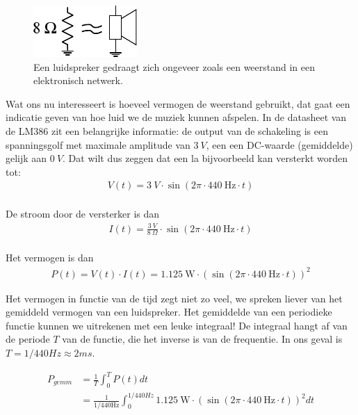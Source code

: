 \documentclass{article}
\begin{document}
			\begin{figure}[htbp]
				\centering
				\includegraphics[scale=1.5]{luidspreker}
				\caption{Een luidspreker gedraagt zich ongeveer zoals een weerstand in een elektronisch netwerk.}
				\label{fig:luidspreker}
			\end{figure}

			Wat ons nu interesseert is hoeveel vermogen de weerstand gebruikt, dat gaat een indicatie geven van hoe luid we de muziek kunnen afspelen.
			In de datasheet van de LM386 zit  een belangrijke informatie: de output van de schakeling is een spanningsgolf met maximale amplitude van $3~V$, een een DC-waarde (gemiddelde) gelijk aan $0~V$.
			Dat wilt dus zeggen dat een la bijvoorbeeld kan versterkt worden tot:
			\begin{align}
				V(t) = 3~V \cdot \sin (2\pi \cdot 440~\text{Hz} \cdot t) \\
			\end{align}

			De stroom door de versterker is dan 
				\begin{align}
				I(t) = \frac{3~V}{8~\Omega} \cdot \sin (2\pi \cdot 440~\text{Hz} \cdot t) \\
			\end{align}

			Het vermogen is dan
			\begin{align}
				P(t) = V(t) \cdot I(t) = 1.125~\text{W} \cdot \left( \sin \left(2\pi \cdot 440~\text{Hz} \cdot t\right) \right)^2
			\end{align}

			Het vermogen in functie van de tijd zegt niet zo veel, we spreken liever van het gemiddeld vermogen van een luidspreker. Het gemiddelde van een periodieke functie kunnen we  uitrekenen met een leuke integraal! De integraal hangt af van de periode $T$ van de functie, die het inverse is van de frequentie. In ons geval is $T = 1/440Hz \approx 2 ms$.

			\begin{align}
				P_{gemm} &= \frac{1}{T} \int_0^T P(t) dt \\ 
				& = \frac{1}{1/440 \text{Hz}} \int_0^{1/440Hz} 1.125~\text{W} \cdot \left( \sin \left(2\pi \cdot 440~\text{Hz} \cdot t\right) \right)^2 dt
			\end{align}
\end{document}
